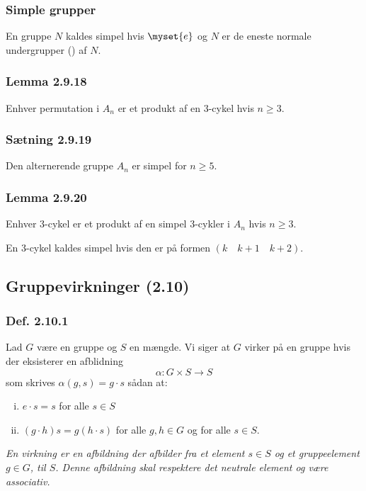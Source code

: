 \subsubsection{Simple grupper}
\label{simple-grupper}
En gruppe $N$ kaldes simpel hvis $\myset{e}$ og $N$ er de eneste normale
undergrupper () af $N$.

\subsubsection{Lemma 2.9.18}
Enhver permutation i $A_n$ er et produkt af en 3-cykel hvis $n \geq 3$.

\subsubsection{Sætning 2.9.19}
Den alternerende gruppe $A_n$ er simpel for $n \geq 5$.

\subsubsection{Lemma 2.9.20}
Enhver 3-cykel er et produkt af en simpel 3-cykler i $A_n$ hvis $n \geq 3$.

En 3-cykel kaldes simpel hvis den er på formen $(k \quad k + 1 \quad k + 2)$.

\subsection{Gruppevirkninger (2.10)}
\subsubsection{Def. 2.10.1}
\label{2.10.1}
Lad $G$ være en gruppe og $S$ en mængde. Vi siger at $G$ virker på en gruppe
hvis der eksisterer en afblidning
\begin{equation*}
  \alpha: G \times S \rightarrow S
\end{equation*}
som skrives $\alpha(g,s) = g \cdot s$ sådan at:
\begin{enumerate}[(i)]
  \item $e \cdot s = s$ for alle $s \in S$
  \item $(g \cdot h) s = g (h \cdot s)$ for alle $g,h \in G$ og for alle $s \in
  S$.
\end{enumerate}

\textit{En virkning er en afbildning der afbilder fra et element $s \in S$ og et
gruppeelement $g \in G$, til $S$. Denne afbildning skal respektere det neutrale
element og være associativ.}

